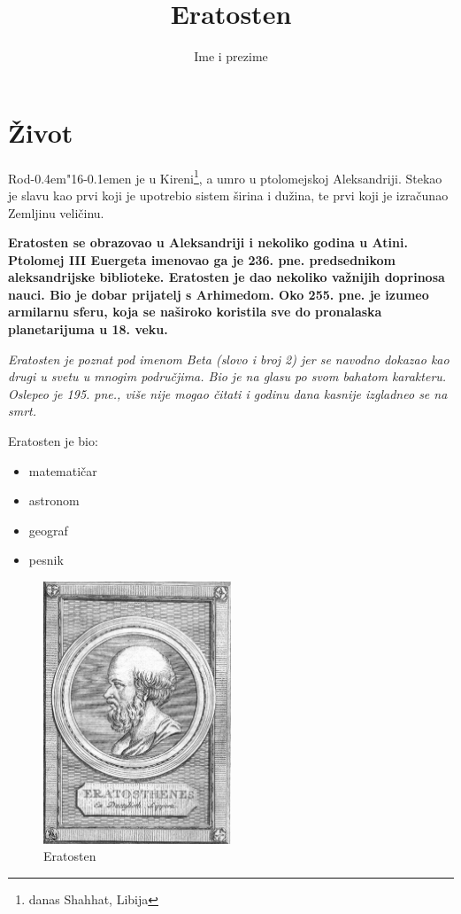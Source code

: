 \documentclass[11pt]{article}
\author{Ime i prezime}
\title{Eratosten}
\def\dj{d\kern-0.4em\char"16\kern-0.1em}
\begin{document}
\maketitle
\thispagestyle{empty}
\newpage

\tableofcontents
\thispagestyle{empty}
\newpage

\pagestyle{plain}
\setcounter{page}{1}

\section{\v Zivot}

Ro\dj en je u Kireni\footnote{danas Shahhat, Libija}, a umro u ptolomejskoj Aleksandriji. Stekao je slavu kao prvi koji je upotrebio sistem \v sirina i du\v zina, te prvi koji je izra\v cunao Zemljinu veli\v cinu.


\bfseries
Eratosten se obrazovao u Aleksandriji i nekoliko godina u Atini. Ptolomej III Euergeta imenovao ga je 236. pne. predsednikom aleksandrijske biblioteke. Eratosten je dao nekoliko va\v znijih doprinosa nauci. Bio je dobar prijatelj s Arhimedom. Oko 255. pne. je izumeo armilarnu sferu, koja se na\v siroko koristila sve do pronalaska planetarijuma u 18. veku.

\itshape
Eratosten je poznat pod imenom Beta (slovo i broj 2) jer se navodno dokazao kao drugi u svetu u mnogim podru\v cjima. Bio je na glasu po svom bahatom karakteru. Oslepeo je 195. pne., vi\v se nije mogao \v citati i godinu dana kasnije izgladneo se na smrt.
\mdseries \upshape

Eratosten je bio:
\begin{itemize}
    \item matemati\v car
    \item astronom
    \item geograf
    \item pesnik
\end{itemize}

\def\figurename{slika}
\begin{figure}[h!]
	\centering
	\includegraphics[width=0.5\textwidth]{Eratosthenes.jpg}
	\caption{Eratosten}
\end{figure}
\end{document}
